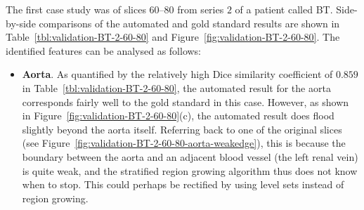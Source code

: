 \fi

The first case study was of slices $60$--$80$ from series $2$ of a patient called BT. Side-by-side comparisons of the automated and gold standard results are shown in Table~\ref{tbl:validation-BT-2-60-80} and Figure~\ref{fig:validation-BT-2-60-80}. The identified features can be analysed as follows:
%
\begin{itemize}

\item \textbf{Aorta}. As quantified by the relatively high Dice similarity coefficient of $0.859$ in Table~\ref{tbl:validation-BT-2-60-80}, the automated result for the aorta corresponds fairly well to the gold standard in this case. However, as shown in Figure~\ref{fig:validation-BT-2-60-80}(c), the automated result does flood slightly beyond the aorta itself. Referring back to one of the original slices (see Figure~\ref{fig:validation-BT-2-60-80-aorta-weakedge}), this is because the boundary between the aorta and an adjacent blood vessel (the left renal vein) is quite weak, and the stratified region growing algorithm thus does not know when to stop. This could perhaps be rectified by using level sets instead of region growing.

\end{itemize}

